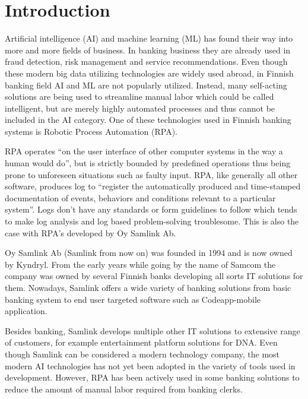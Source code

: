 

\section{Introduction}\label{sec:introduction}

\thispagestyle{empty}
Artificial intelligence (AI) and machine learning (ML)
has found their way into
more and more fields of business.
In banking business they are already used in
fraud detection, risk management and service recommendations.\cite{donepudi2017machine}
Even though these
modern big data utilizing technologies
are widely used abroad,
in Finnish banking field AI and ML are not popularly utilized.
Instead,
many self-acting solutions are being used
to streamline manual labor
which could be called intelligent, %
but are merely highly automated processes
and thus cannot be included in the AI category.
One of these technologies used in Finnish banking systems
is Robotic Process Automation (RPA).

RPA operates \enquote{on the user interface of other computer systems
in the way a human would do},\cite{van2018robotic}
but is strictly bounded by predefined operations
thus being prone to unforeseen situations
such as faulty input.
RPA, like generally all other software,
produces log to \enquote{register
the automatically produced and time-stamped documentation
of events, behaviors and conditions
relevant to a particular system}\cite{delarosa2018log}.
Logs don't have any standards or form guidelines to follow
which tends to make
log analysis and log based problem-solving troublesome.
This is also the case with RPA's developed by Oy Samlink Ab.

Oy Samlink Ab (Samlink from now on)
was founded in 1994
and is now owned by Kyndryl.
From the early years
while going by the name of Samcom
the company was owned by several Finnish banks
developing all sorts IT solutions for them.
Nowadays,
Samlink offers a wide variety of banking solutions
from basic banking system to end user targeted software
such as Codeapp-mobile application.

Besides banking,
Samlink develops multiple other IT solutions
to extensive range of customers,
for example
entertainment platform solutions for DNA\@.
Even though Samlink can be considered
a modern technology company,
the most modern AI technologies has not yet been adopted
in the variety of tools used in development.
However,
RPA has been actively used
in some banking solutions
to reduce the amount of manual labor required
from banking clerks.

